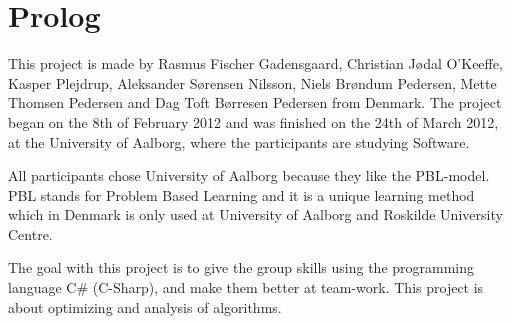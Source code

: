\chapter{Prolog}

This project is made by Rasmus Fischer Gadensgaard, Christian Jødal O’Keeffe, Kasper Plejdrup, Aleksander Sørensen Nilsson, Niels Brøndum Pedersen, Mette Thomsen Pedersen and Dag Toft Børresen Pedersen from Denmark. The project began on the 8th of February 2012 and was finished on the 24th of March 2012, at the University of Aalborg, where the participants are studying Software.

All participants chose University of Aalborg because they like the PBL-model. PBL stands for Problem Based Learning and it is a unique learning method which in Denmark is only used at University of Aalborg and Roskilde University Centre.

The goal with this project is to give the group skills using the programming language C\# (C-Sharp), and make them better at team-work. This project is about optimizing and analysis of algorithms.